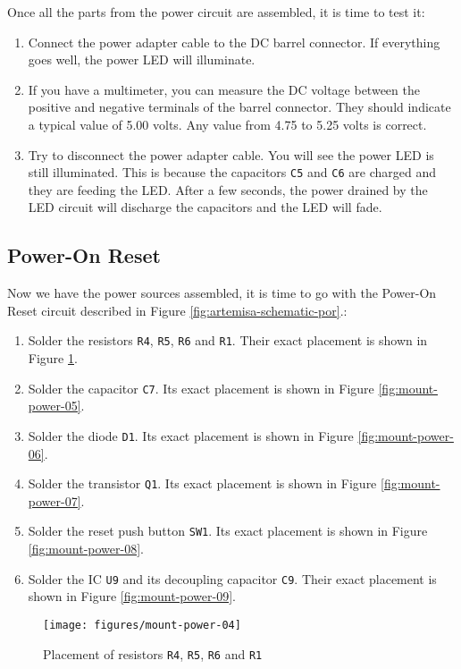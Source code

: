 Once all the parts from the power circuit are assembled, it is time to test it:

\begin{enumerate}
  \item Connect the power adapter cable to the DC barrel connector. If everything goes well, the power LED will illuminate.
  \item If you have a multimeter, you can measure the DC voltage between the positive and negative terminals of the barrel connector. They should indicate a typical value of 5.00 volts. Any value from 4.75 to 5.25 volts is correct.
  \item Try to disconnect the power adapter cable. You will see the power LED is still illuminated. This is because the capacitors {\tt C5} and {\tt C6} are charged and they are feeding the LED. After a few seconds, the power drained by the LED circuit will discharge the capacitors and the LED will fade.
\end{enumerate}

\subsection{Power-On Reset}

Now we have the power sources assembled, it is time to go with the Power-On Reset circuit described in Figure \ref{fig:artemisa-schematic-por}.:

\begin{enumerate}
  \item Solder the resistors {\tt R4}, {\tt R5}, {\tt R6} and {\tt R1}. Their exact placement is shown in Figure \ref{fig:mount-power-04}.
  \item Solder the capacitor {\tt C7}. Its exact placement is shown in Figure \ref{fig:mount-power-05}.
  \item Solder the diode {\tt D1}. Its exact placement is shown in Figure \ref{fig:mount-power-06}.
  \item Solder the transistor {\tt Q1}. Its exact placement is shown in Figure \ref{fig:mount-power-07}.
  \item Solder the reset push button {\tt SW1}. Its exact placement is shown in Figure \ref{fig:mount-power-08}.
  \item Solder the IC {\tt U9} and its decoupling capacitor {\tt C9}. Their exact placement is shown in Figure \ref{fig:mount-power-09}.
\end{enumerate}

\begin{figure}[htbp]
  \centering
  \texttt{[image: figures/mount-power-04]}
  \caption{Placement of resistors {\tt R4}, {\tt R5}, {\tt R6} and {\tt R1}}
  \label{fig:mount-power-04}
\end{figure}

